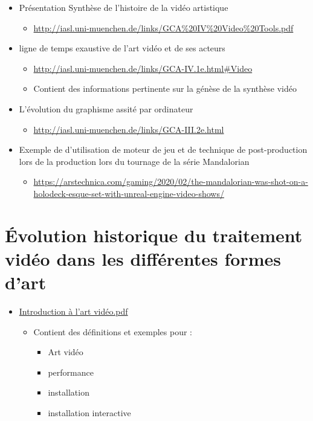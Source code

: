\documentclass[
  french,
]{book}
\providecommand{\tightlist}{%
  \setlength{\itemsep}{0pt}\setlength{\parskip}{0pt}}
\begin{document}
\begin{itemize}
\tightlist
\item
  Présentation Synthèse de l'histoire de la vidéo artistique

  \begin{itemize}
  \tightlist
  \item
    \url{http://iasl.uni-muenchen.de/links/GCA\%20IV\%20Video\%20Tools.pdf}
  \end{itemize}
\item
  ligne de temps exaustive de l'art vidéo et de ses acteurs

  \begin{itemize}
  \tightlist
  \item
    \url{http://iasl.uni-muenchen.de/links/GCA-IV.1e.html\#Video}
  \item
    Contient des informations pertinente sur la génèse de la synthèse vidéo
  \end{itemize}
\item
  L'évolution du graphisme assité par ordinateur

  \begin{itemize}
  \tightlist
  \item
    \url{http://iasl.uni-muenchen.de/links/GCA-III.2e.html}
  \end{itemize}
\item
  Exemple de d'utilisation de moteur de jeu et de technique de post-production lors de la production lors du tournage de la série Mandalorian

  \begin{itemize}
  \tightlist
  \item
    \url{https://arstechnica.com/gaming/2020/02/the-mandalorian-was-shot-on-a-holodeck-esque-set-with-unreal-engine-video-shows/}
  \end{itemize}
\end{itemize}

\hypertarget{evolution_historique}{%
\section{Évolution historique du traitement vidéo dans les différentes formes d'art}\label{evolution_historique}}

\begin{itemize}
\tightlist
\item
  \href{https://www.lerecit.fr/wp-content/uploads/2017/08/introduction-\%C3\%A0-lArt-Vid\%C3\%A9o.pdf}{Introduction à l'art vidéo.pdf}

  \begin{itemize}
  \tightlist
  \item
    Contient des définitions et exemples pour :

    \begin{itemize}
    \tightlist
    \item
      Art vidéo
    \item
      performance
    \item
      installation
    \item
      installation interactive
    \end{itemize}
  \end{itemize}
\end{itemize}
\end{document}
